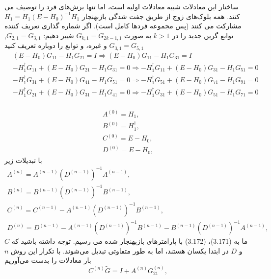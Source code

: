 ساختار این معادلات شبیه معادلات اولیه است، اما تنها برش‌های فرد را توصیف می کنند. همه بلوک‌های زوج از طریق جفت شدگی بازبهنجار $H_1 = H_1 (E - H_0)^{-1}H_{1}$ مشارکت می کنند (پس مجموعه فردها کامل است). اگر شماره گذاری تعریف کننده توابع گرین جدید را در $k > 1$ به صورت $G_{k,1}= G_{2k-1,1}$ تغییر دهیم: $G_{2,1} = G_{3,1}$, $G_{3,1} = G_{5,1}$ و غیره، و توابع را دوباره تعریف کنید
\begin{equation}
    \begin{aligned}
        & \left( E-{{H}_{0}} \right){{G}_{11}}-{{H}_{1}}{{G}_{21}}=I\Rightarrow \left( E-{{H}_{0}} \right){{G}_{11}}-{{H}_{1}}{{G}_{31}}=I \\ 
       & -H_{1}^{\dagger }{{G}_{11}}+\left( E-{{H}_{0}} \right){{G}_{21}}-{{H}_{1}}{{G}_{31}}=0\Rightarrow -H_{1}^{\dagger }{{G}_{11}}+\left( E-{{H}_{0}} \right){{G}_{31}}-{{H}_{1}}{{G}_{51}}=0 \\ 
       & -H_{1}^{\dagger }{{G}_{31}}+\left( E-{{H}_{0}} \right){{G}_{41}}-{{H}_{1}}{{G}_{51}}=0\Rightarrow -H_{1}^{\dagger }{{G}_{51}}+\left( E-{{H}_{0}} \right){{G}_{71}}-{{H}_{1}}{{G}_{91}}=0 \\ 
       & -H_{1}^{\dagger }{{G}_{21}}+\left( E-{{H}_{0}} \right){{G}_{31}}-{{H}_{1}}{{G}_{41}}=0\Rightarrow -H_{1}^{\dagger }{{G}_{31}}+\left( E-{{H}_{0}} \right){{G}_{51}}-{{H}_{1}}{{G}_{71}}=0 \\ 
      \end{aligned}
\end{equation}

\begin{equation}
    \begin{aligned}
        {{A}^{(0)}}={{H}_{1}},\\
        {{B}^{(0)}}=H_{1}^{\dagger},\\
        {{C}^{(0)}}=E-{{H}_{0}},\\
        {{D}^{(0)}}=E-{{H}_{0}},
    \end{aligned}
\end{equation}
با تبدیلات زیر
\begin{equation}
    \begin{aligned}
        {{A}^{(n)}}={{A}^{(n-1)}}{{({{D}^{(n-1)}})}^{-1}}{{A}^{(n-1)}},\\
        {{B}^{(n)}}={{B}^{(n-1)}}{{({{D}^{(n-1)}})}^{-1}}{{B}^{(n-1)}},\\
        {{C}^{(n)}}={{C}^{(n-1)}}-{{A}^{(n-1)}}{{({{D}^{(n-1)}})}^{-1}}{{B}^{(n-1)}},\\
        {{D}^{(n)}}={{D}^{(n-1)}}-{{A}^{(n-1)}}{{({{D}^{(n-1)}})}^{-1}}{{B}^{(n-1)}}-{{B}^{(n-1)}}{{({{D}^{(n-1)}})}^{-1}}{{A}^{(n-1)}},
    \end{aligned}
\end{equation}
ما به (3.171)، (3.172) با پارامترهای بازبهنجار شده می رسیم. توجه داشته باشید که $C$ و $D$ در ابتدا یکسان هستند، اما به طور متفاوتی تبدیل می‌شوند. با تکرار این روش $n$ بار معادلات را بدست می‌آوریم
\begin{equation}
    {{C}^{(n)}}\tilde{G}=I+{{A}^{(n)}}G_{21}^{(n)},
\end{equation}

